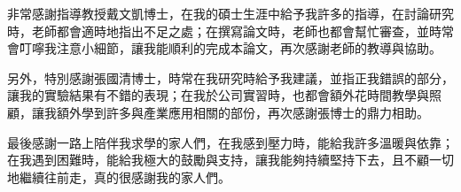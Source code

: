 
非常感謝指導教授戴文凱博士，在我的碩士生涯中給予我許多的指導，在討論研究時，老師都會適時地指出不足之處；在撰寫論文時，老師也都會幫忙審查，並時常會叮嚀我注意小細節，讓我能順利的完成本論文，再次感謝老師的教導與協助。

另外，特別感謝張國清博士，時常在我研究時給予我建議，並指正我錯誤的部分，讓我的實驗結果有不錯的表現；在我於公司實習時，也都會額外花時間教學與照顧，讓我額外學到許多與產業應用相關的部份，再次感謝張博士的鼎力相助。

最後感謝一路上陪伴我求學的家人們，在我感到壓力時，能給我許多溫暖與依靠；在我遇到困難時，能給我極大的鼓勵與支持，讓我能夠持續堅持下去，且不顧一切地繼續往前走，真的很感謝我的家人們。